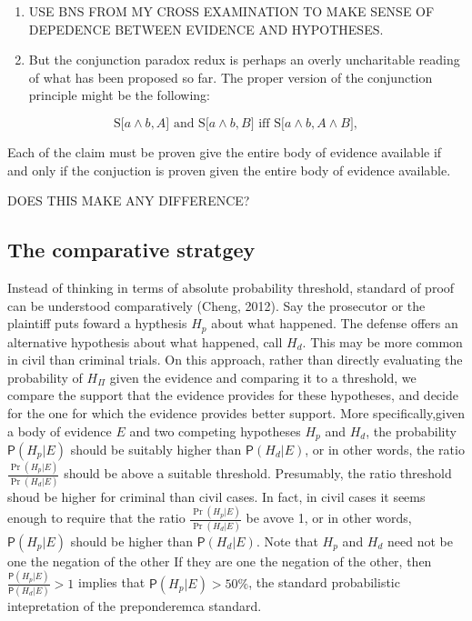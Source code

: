 \documentclass[10pt,dvipsnames,enabledeprecatedfontcommands]{scrartcl}
\newcommand{\et}{\wedge}
\newcommand{\pr}[1]{\mathsf{P}(#1)}
\begin{document}
\begin{enumerate}
\def\labelenumi{(\arabic{enumi})}
\setcounter{enumi}{1}
\item
  USE BNS FROM MY CROSS EXAMINATION TO MAKE SENSE OF DEPEDENCE BETWEEN
  EVIDENCE AND HYPOTHESES.
\item
  But the conjunction paradox redux is perhaps an overly uncharitable
  reading of what has been proposed so far. The proper version of the
  conjunction principle might be the following:
\end{enumerate}

\[\text{S[$a \et b, A$] and S[$a \et b, B$] iff S[$a \wedge b, A\wedge B$]},\]

\noindent Each of the claim must be proven give the entire body of
evidence available if and only if the conjuction is proven given the
entire body of evidence available.

DOES THIS MAKE ANY DIFFERENCE?

\hypertarget{the-comparative-stratgey}{%
\subsection{The comparative stratgey}\label{the-comparative-stratgey}}

Instead of thinking in terms of absolute probability threshold, standard
of proof can be understood comparatively (Cheng, 2012). Say the
prosecutor or the plaintiff puts foward a hypthesis \(H_p\) about what
happened. The defense offers an alternative hypothesis about what
happened, call \(H_d\). This may be more common in civil than criminal
trials. On this approach, rather than directly evaluating the
probability of \(H_\Pi\) given the evidence and comparing it to a
threshold, we compare the support that the evidence provides for these
hypotheses, and decide for the one for which the evidence provides
better support. More specifically,given a body of evidence \(E\) and two
competing hypotheses \(H_p\) and \(H_d\), the probability
\(\pr{H_p | E}\) should be suitably higher than \(\pr{H_d | E}\), or in
other words, the ratio \(\frac{\Pr(H_p | E)}{\Pr(H_d | E)}\) should be
above a suitable threshold. Presumably, the ratio threshold shoud be
higher for criminal than civil cases. In fact, in civil cases it seems
enough to require that the ratio \(\frac{\Pr(H_p | E)}{\Pr(H_d | E)}\)
be avove 1, or in other words, \(\pr{H_p | E}\) should be higher than
\(\pr{H_d | E}\). Note that \(H_p\) and \(H_d\) need not be one the
negation of the other If they are one the negation of the other, then
\(\frac{\pr{H_p | E}}{\pr{H_d | E}}>1\) implies that
\(\pr{H_p | E}>50\%\), the standard probabilistic intepretation of the
preponderemca standard.
\end{document}
